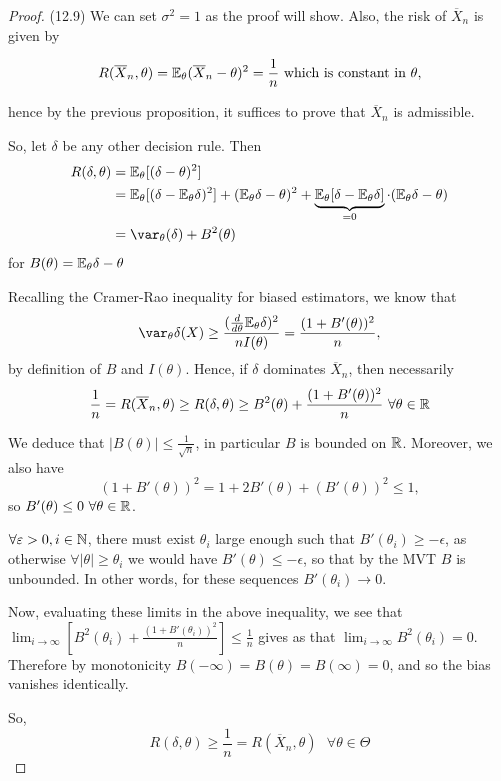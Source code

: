\documentclass[a4paper]{article}
\begin{document}
\begin{proof}(12.9)
	We can set $\sigma^2=1$ as the proof will show. Also, the risk of $\overline{X}_n$ is given by

	\[
		R(\overline{X}_n, \theta) = \mathbb{E}_{\theta} (\overline{X}_n - \theta)^2 =\frac{1}{n} \text{ which is constant in } \theta
	,\]

	hence by the previous proposition,  it suffices to prove that $\overline{X}_n$ is admissible.

	So, let $\delta$ be any other decision rule. Then
	\begin{align*}
		R(\delta,\theta) &= \E_{\theta} [(\delta - \theta)^2] \\
		&= \E_{\theta} [(\delta - \E_{\theta} \delta)^2] + (\E_{\theta} \delta - \theta)^2 + \underbrace{\E_{\theta}[\delta -\E_{\theta}\delta ]}_{=0} \cdot (\E_{\theta}\delta - \theta)\\
		&= \var_{\theta}(\delta) + B^2(\theta)
	\end{align*}
	for $B(\theta) = \mathbb{E}_{\theta}\delta - \theta$

	Recalling the Cramer-Rao inequality for biased estimators, we know that
	\[
	\var_{\theta}\delta(X) \ge  \frac{(\frac{d}{d\theta} \E_{\theta}\delta)^2}{nI(\theta)} = \frac{(1+B'(\theta))^2}{n}
	,\]
	by definition of $B$ and $I(\theta)$. Hence, if  $\delta $ dominates $\overline{X}_n$, then necessarily
	\[
		\frac{1}{n} = R(\overline{X}_n, \theta) \ge R(\delta, \theta) \ge B^2(\theta) + \frac{(1+B'(\theta))^2}{n} \text{ } \forall \theta\in \mathbb{R}
	\]

	We deduce that $|B(\theta)| \le \frac{1}{\sqrt{n} }$, in particular $B$ is bounded on $\mathbb{R}$. Moreover, we also have
	 \[
		 (1+B'(\theta))^2 = 1 +2B'(\theta) + (B'(\theta))^2 \le 1 
	,\]
	so $B'(\theta) \le 0 \text{ } \forall \theta \in \mathbb{R}$.

	$\forall \varepsilon >0, i \in \mathbb{N}$, there must exist $\theta_i$ large enough such that $B'(\theta_i) \ge - \epsilon$, as otherwise $\forall |\theta| \ge \theta_i $ we would have $B'(\theta) \le - \epsilon$, so that by the MVT $B$ is unbounded. In other words, for these sequences $B'(\theta_i) \to 0$.

	Now, evaluating these limits in the above inequality, we see that $\lim_{i\to \infty}\left[ B^2(\theta_i) + \frac{(1+B'(\theta_i))^2}{n} \right] \le \frac{1}{n} $ gives as that $\lim_{i\to \infty} B^2(\theta_i) = 0$. Therefore by monotonicity $B(-\infty) = B(\theta) = B(\infty) = 0$, and so the bias vanishes identically.

	So,
	\[
		R(\delta, \theta) \ge \frac{1}{n} = R(\overline{X}_n, \theta) \text{ } \forall \theta \in \Theta
	\] 
\end{proof}
\end{document}
